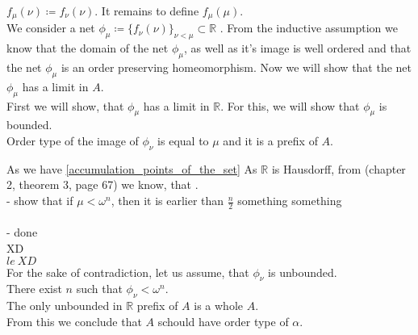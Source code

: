 $f_\mu(\nu) \coloneqq f_\nu(\nu)$. It remains to define $f_\mu(\mu)$. \\
We consider a net $\phi_\mu \coloneqq \{f_\nu(\nu)\}_{\nu<\mu} \subset \mathbb{R}$
. From the inductive assumption we know that the domain of the net $\phi_\mu$, as 
well as it's image is well ordered and that the net $\phi_\mu$ 
is an order preserving homeomorphism.
Now we will show that the net $\phi_\mu$ has a limit in $A$. \\
First we will show, that $\phi_\mu$ has a limit in $\mathbb{R}$. For this, we will show that 
$\phi_\mu$ is bounded. \\
Order type of the image of $\phi_\nu$ is equal to $\mu$ and it is a prefix of $A$. 

As we have \ref{accumulation_points_of_the_set} 
As $\mathbb{R}$ is Hausdorff, from \cite{Kelley1975} (chapter 2, 
theorem 3, page 67) we know, that .  
\\ 
- show that if $\mu < \omega^n$, then it is earlier than $\frac{n}{2}$ something something\\
\smalltodo 
\\
- done\\
XD \\
$le\ XD$ \\ 
For the sake of contradiction, let us assume, that $\phi_\nu$ is unbounded. \\
There exist $n$ such that $\phi_\nu < \omega^n$. \\
The only unbounded in $\mathbb{R}$ prefix of $A$ is a whole $A$. \\ 
From this we conclude that $A$ schould have order type of $\alpha$.
\\ 
